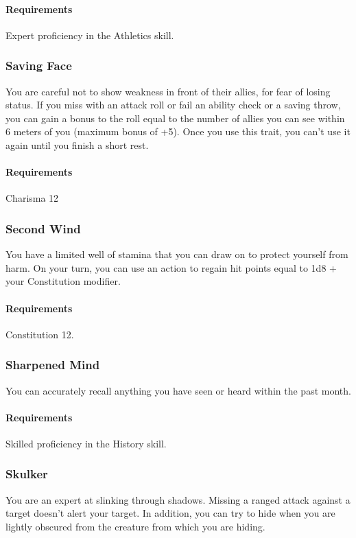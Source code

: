     \paragraph{Requirements} Expert proficiency in the Athletics skill.
\subsubsection{Saving Face} \label{feat::savingface}
    You are careful not to show weakness in front of their allies, for fear of losing status.
    If you miss with an attack roll or fail an ability check or a saving throw, you can gain a bonus to the roll equal to the number of allies you can see within 6 meters of you (maximum bonus of +5).
    Once you use this trait, you can't use it again until you finish a short rest.
    \paragraph{Requirements} Charisma 12
\subsubsection{Second Wind} \label{feat::secondwind}
    You have a limited well of stamina that you can draw on to protect yourself from harm.
    On your turn, you can use an action to regain hit points equal to 1d8 + your Constitution modifier.
    \paragraph{Requirements} Constitution 12.
\subsubsection{Sharpened Mind} \label{feat::sharpenedmind}
    You can accurately recall anything you have seen or heard within the past month.
    \paragraph{Requirements} Skilled proficiency in the History skill.
\subsubsection{Skulker} \label{feat::skulker}
    You are an expert at slinking through shadows.
    Missing a ranged attack against a target doesn't alert your target.
    In addition, you can try to hide when you are lightly obscured from the creature from which you are hiding.
